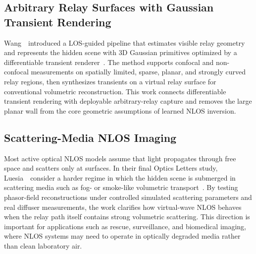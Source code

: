 \subsection{Arbitrary Relay Surfaces with Gaussian Transient Rendering}
Wang~\etal~introduced a LOS-guided pipeline that estimates visible relay geometry and represents the hidden scene with 3D Gaussian primitives optimized by a differentiable transient renderer~\cite{wangGaussianTransientRendering2026}. The method supports confocal and non-confocal measurements on spatially limited, sparse, planar, and strongly curved relay regions, then synthesizes transients on a virtual relay surface for conventional volumetric reconstruction. This work connects differentiable transient rendering with deployable arbitrary-relay capture and removes the large planar wall from the core geometric assumptions of learned NLOS inversion.

\subsection{Scattering-Media NLOS Imaging}
Most active optical NLOS models assume that light propagates through free space and scatters only at surfaces. In their final Optics Letters study, Luesia~\etal~consider a harder regime in which the hidden scene is submerged in scattering media such as fog- or smoke-like volumetric transport~\cite{luesiaScatteringPhasor2023}. By testing phasor-field reconstructions under controlled simulated scattering parameters and real diffuser measurements, the work clarifies how virtual-wave NLOS behaves when the relay path itself contains strong volumetric scattering. This direction is important for applications such as rescue, surveillance, and biomedical imaging, where NLOS systems may need to operate in optically degraded media rather than clean laboratory air.

